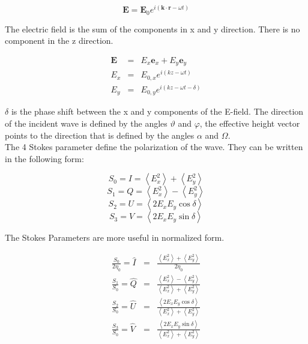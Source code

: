 \documentclass[a4paper,11pt]{report}
\begin{document}
\begin{equation}
\textbf{E}=\textbf{E}_0 e^{i(\textbf{k} \cdot \textbf{r} - \omega t)}
\end{equation}


The electric field is the sum of the components in x and y direction. There is no component in the z direction.

\begin{eqnarray}
\textbf{E}&=&E_x\textbf{e}_x + E_y\textbf{e}_y\\
E_x&=&E_{0,x} e^{i(kz - \omega t)} \label{Ex} \\
E_y&=&E_{0,y} e^{i(kz - \omega t - \delta)} \label{Ey}
\end{eqnarray}

$\delta$ is the phase shift between the x and y components of the E-field. The direction of the incident wave is defined by the angles $\vartheta$ and $\varphi$, the effective height vector points to the direction that is defined by the angles $\alpha$ and $\Omega$.\\

The 4 Stokes parameter define the polarization of the wave. They can be written in the following form:

\begin{equation}
S_0=I= \left\langle E_{x}^2\right\rangle +\left\langle E_{y}^2\right\rangle
\end{equation}
\begin{equation}
S_1=Q=\left\langle E_{x}^2\right\rangle-\left\langle E_{y}^2\right\rangle
\end{equation}
\begin{equation}
S_2=U=\left\langle2E_{x} E_{y} \cos \delta \right\rangle
\end{equation}
\begin{equation}
S_3=V=\left\langle2E_{x} E_{y} \sin\delta\right\rangle
\end{equation}

The Stokes Parameters are more useful in normalized form.

\begin{eqnarray}
\frac{S_0}{2\eta_0} = \hat{I} &=& \frac{\left\langle E_{x}^2\right\rangle +\left\langle E_{y}^2\right\rangle}{2\eta_0} \label{norm_stokes_1}
\\
\frac{S_1}{S_0}=\hat{Q}&=&\frac{\left\langle E_{x}^2\right\rangle-\left\langle E_{y}^2\right\rangle}{\left\langle E_{x}^2\right\rangle +\left\langle E_{y}^2\right\rangle}\label{norm_stokes_2}
\\
\frac{S_2}{S_0}=\hat{U}&=&\frac{\left\langle2E_{x} E_{y} \cos\delta\right\rangle}{\left\langle E_{x}^2\right\rangle +\left\langle E_{y}^2\right\rangle}\label{norm_stokes_3}
\\
\frac{S_3}{S_0}=\hat{V}&=&\frac{\left\langle2E_{x} E_{y} \sin\delta\right\rangle}{\left\langle E_{x}^2\right\rangle +\left\langle E_{y}^2\right\rangle}\label{norm_stokes_4}
\end{eqnarray}
\end{document}
